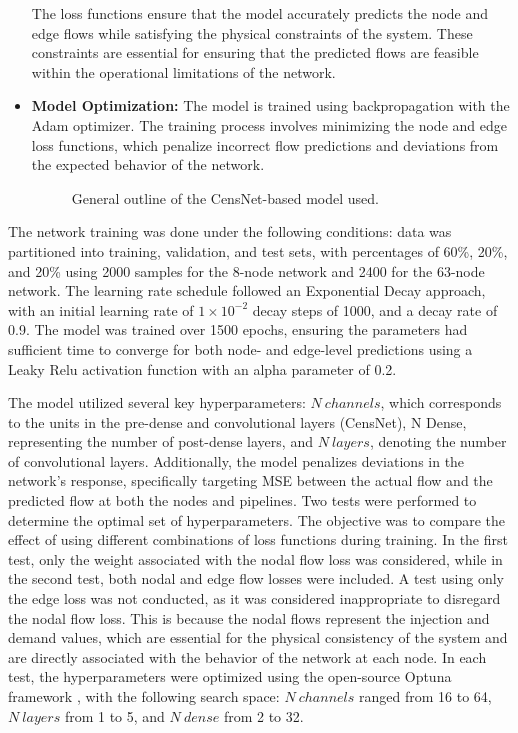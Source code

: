 \begin{itemize}
The loss functions ensure that the model accurately predicts the node and edge flows while satisfying the physical constraints of the system. These constraints are essential for ensuring that the predicted flows are feasible within the operational limitations of the network. 
    \item \textbf{Model Optimization:} The model is trained using backpropagation with the Adam optimizer. The training process involves minimizing the node and edge loss functions, which penalize incorrect flow predictions and deviations from the expected behavior of the network.

\begin{figure}
    \centering
    \setlength{}        
    \setlength{}
    \resizebox{\figurewidth}{\figureheight}{}
    \caption{General outline of the CensNet-based model used.}
    \label{fig:model_description}
\end{figure}
\end{itemize}


The network training was done under the following conditions: data was partitioned into training, validation, and test sets, with percentages of 60\%, 20\%, and 20\% using 2000 samples for the 8-node network and 2400 for the 63-node network. The learning rate schedule followed an Exponential Decay approach, with an initial learning rate of $1 \times 10^{-2}$ decay steps of 1000, and a decay rate of 0.9. The model was trained over 1500 epochs, ensuring the parameters had sufficient time to converge for both node- and edge-level predictions using a Leaky Relu activation function with an alpha parameter of 0.2.


The model utilized several key hyperparameters: $N \ channels$, which corresponds to the units in the pre-dense and convolutional layers (CensNet), N Dense, representing the number of post-dense layers, and $N \ layers$, denoting the number of convolutional layers. Additionally, the model penalizes deviations in the network's response, specifically targeting MSE between the actual flow and the predicted flow at both the nodes and pipelines. Two tests were performed to determine the optimal set of hyperparameters. The objective was to compare the effect of using different combinations of loss functions during training. In the first test, only the weight associated with the nodal flow loss was considered, while in the second test, both nodal and edge flow losses were included. A test using only the edge loss was not conducted, as it was considered inappropriate to disregard the nodal flow loss. This is because the nodal flows represent the injection and demand values, which are essential for the physical consistency of the system and are directly associated with the behavior of the network at each node. In each test, the hyperparameters were optimized using the open-source Optuna framework \cite{optuna_2019}, with the following search space: $N \ channels$ ranged from 16 to 64, $N \ layers$ from 1 to 5, and $N \ dense$ from 2 to 32.


